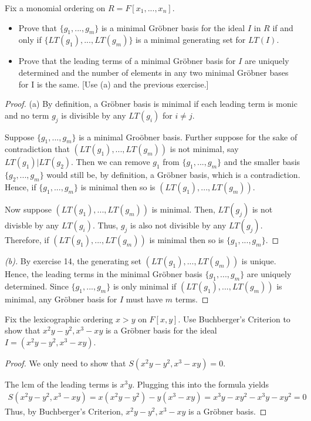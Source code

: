 \documentclass[10pt]{article}
\newenvironment{problem}[2][Problem]{\begin{trivlist}
		\item[\hskip \labelsep {\bfseries #1}\hskip \labelsep {\bfseries #2.}]}{\end{trivlist}}
\begin{document}
	\begin{problem}{6.15}
		Fix a monomial ordering on $R = F[x_1, ..., x_n]$.
		\begin{itemize}
			\item[\textbf{(a)}]Prove that $\{g_1, ..., g_m\}$ is a minimal Gr\"obner basis for the ideal $I$ in $R$ if and only if $\{LT(g_1), ..., LT(g_m)\}$ is a minimal generating set for $LT(I)$.
			\item[\textbf{(b)}]Prove that the leading terms of a minimal Gr\"obner basis for $I$ are uniquely determined and the number of elements in any two minimal Gr\"obner bases for I is the same. [Use (a) and the previous exercise.]
		\end{itemize}
		\begin{proof}{(a)}
			By definition, a Gr\"obner basis is minimal if each leading term is monic and no term $g_j$ is divisible by any $LT(g_i)$ for $i \not= j$.
			
			Suppose $\{g_1, ..., g_m\}$ is a minimal Gro\"obner basis. Further suppose for the sake of contradiction that $(LT(g_1), ..., LT(g_m))$ is not minimal, say $LT(g_1) | LT(g_2)$. Then we can remove $g_1$ from $\{g_1, ..., g_m\}$ and the smaller basis $\{g_2, ..., g_m\}$ would still be, by definition, a Gr\"obner basis, which is a contradiction. Hence, if $\{g_1, ..., g_m\}$ is minimal then so is $(LT(g_1), ..., LT(g_m))$.
			
			Now suppose $(LT(g_1), ..., LT(g_m))$ is minimal. Then, $LT(g_j)$ is not divisble by any $LT(g_i)$. Thus, $g_j$ is also not divisible by any $LT(g_j)$. Therefore, if $(LT(g_1), ..., LT(g_m))$ is minimal then so is $\{g_1, ..., g_m\}$.
		\end{proof}
		
		\begin{proof}[(b)]
			By exercise 14, the generating set $(LT(g_1), ..., LT(g_m))$ is unique. Hence, the leading terms in the minimal Gr\"obner basis $\{g_1, ..., g_m\}$ are uniquely determined. Since $\{g_1, ..., g_m\}$ is only minimal if $(LT(g_1), ..., LT(g_m))$ is minimal, any Gr\"obner basis for $I$ must have $m$ terms.
		\end{proof}
	\end{problem}
	
	\begin{problem}{6.17}
		Fix the lexicographic ordering $x > y$ on $F[x , y]$. Use Buchberger's Criterion to show that ${x^2y - y^2, x^3 - xy}$ is a Gr\"obner basis for the ideal $I = (x^2y - y^2, x^3 - xy)$.
		\begin{proof}
			We only need to show that $S(x^2y - y^2, x^3 - xy) = 0$.
			
			The lcm of the leading terms is $x^3y$. Plugging this into the formula yields
			\begin{align*}
				S(x^2y - y^2, x^3 - xy) = x(x^2y - y^2) - y(x^3 - xy) = x^3y - xy^2 - x^3y - xy^2 = 0
			\end{align*}
			Thus, by Buchberger's Criterion, ${x^2y - y^2, x^3 - xy}$ is a Gr\"obner basis.
			
		\end{proof}
	\end{problem}
	
\end{document}
